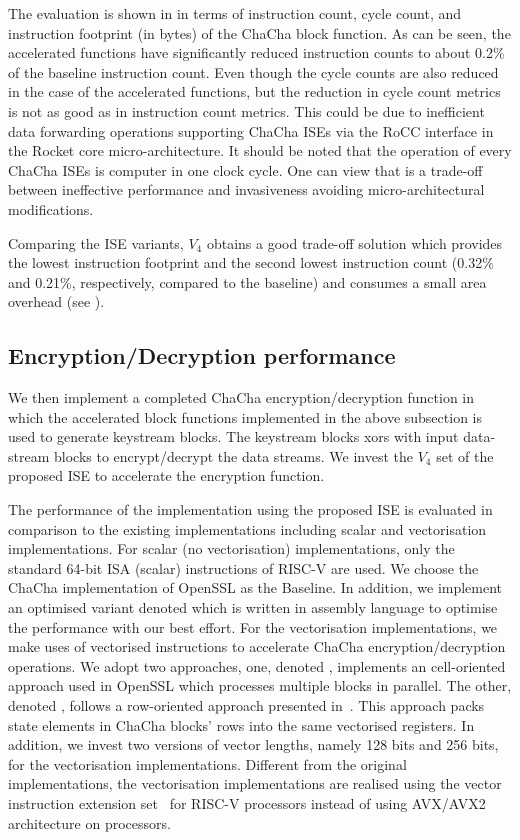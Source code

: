 The evaluation is shown in  in terms of instruction count, cycle count, and instruction footprint (in bytes) of the ChaCha block function. As can be seen, the accelerated functions have significantly reduced instruction counts to about 0.2\% of the baseline instruction count. Even though the cycle counts are also reduced in the case of the accelerated functions, but the reduction in cycle count metrics is not as good as in instruction count metrics. This could be due to inefficient data forwarding operations supporting ChaCha ISEs via the RoCC interface in the Rocket core micro-architecture. It should be noted that the operation of every ChaCha ISEs is computer in one clock cycle. One can view that is a trade-off between ineffective performance and invasiveness avoiding micro-architectural modifications.

Comparing the ISE variants, $V_4$ obtains a good trade-off solution which provides the lowest instruction footprint and the second lowest instruction count (0.32\% and 0.21\%, respectively, compared to the baseline) and consumes a small area overhead (see ).

\subsection{Encryption/Decryption performance}
We then implement a completed ChaCha encryption/decryption function in which the accelerated block functions implemented in the above subsection is used to generate keystream blocks. The keystream blocks xors with input data-stream blocks to encrypt/decrypt the data streams. We invest the $V_4$ set of the proposed ISE to accelerate the encryption function. 

The performance of the implementation using the proposed ISE is evaluated in comparison to the existing implementations including scalar and vectorisation implementations.  
For scalar (no vectorisation) implementations, only the standard 64-bit ISA (scalar) instructions of RISC-V are used. We choose the ChaCha implementation of OpenSSL as the Baseline. In addition, we implement an optimised variant denoted  which is written in assembly language to optimise the performance with our best effort. 
For the vectorisation implementations, we make uses of vectorised instructions to accelerate ChaCha encryption/decryption operations. 
We adopt two approaches, one, denoted , implements an cell-oriented approach used in OpenSSL which processes multiple blocks in parallel.
The other, denoted , follows a row-oriented approach presented in~\cite{GolGue:14}. This approach packs state elements in ChaCha blocks' rows into the same vectorised registers.
In addition, we invest two versions of vector lengths, namely 128 bits and 256 bits, for the vectorisation implementations. 
Different from the original implementations, the vectorisation implementations are realised using the vector instruction extension set~\cite{riscv:ext:vector:draft} for RISC-V processors instead of using AVX/AVX2 architecture on  processors.

